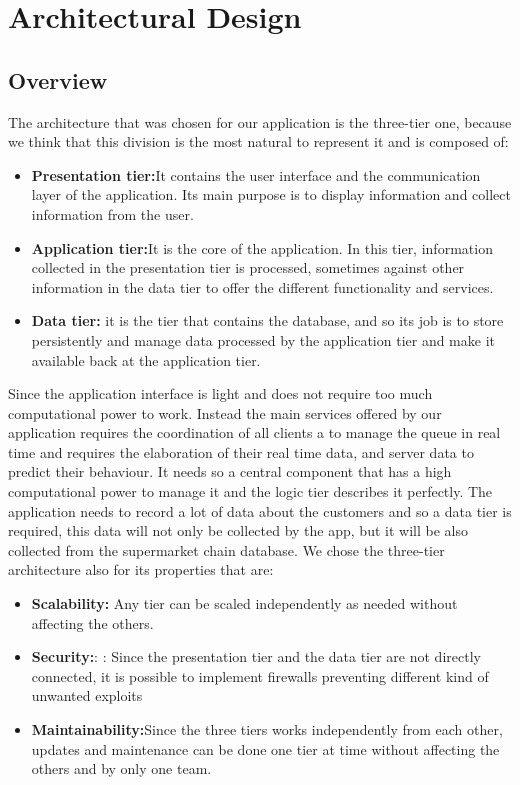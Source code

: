 \chapter{Architectural Design}

\section{Overview}
The architecture that was chosen for our application is the three-tier one, because we think that this division is the most natural to represent it and is composed of: 
\begin{itemize}
	\item \textbf{Presentation tier:}It contains the user interface and the communication layer of the application. Its main purpose is to display information and 			collect information from the user.

	\item \textbf{Application tier:}It is the core of the application. In this tier, information collected in the presentation tier is processed, sometimes against 			other information in the data tier to offer the different functionality and services.

	\item \textbf{Data tier:} it is the tier that contains the database, and so its job is to store persistently and manage data processed by the application tier and 	make it available back at the application tier.
\end{itemize}
Since the application interface is light and does not require too much computational power to work.
Instead the main services offered by our application requires the coordination of all clients a to manage the queue in real time and requires the elaboration of their real time data, and server data to predict their behaviour. It needs so a central component that has a high computational power to manage it and the logic tier describes it perfectly. The application needs to record a lot of data about the customers and so a data tier is required, this data will not only be collected by the app, but it will be also collected from the supermarket chain database.
We chose the three-tier architecture also for its properties that are:
\begin{itemize}
	\item \textbf{Scalability:} Any tier can be scaled independently as needed without affecting the others.

	\item \textbf{Security:}: : Since the presentation tier and the data tier are not directly connected, it is possible to implement firewalls preventing different 			kind of unwanted exploits

	\item \textbf{Maintainability:}Since the three tiers works independently from each other, updates and maintenance can be done one tier at time without 			affecting the others and by only one team. 
\end{itemize}
